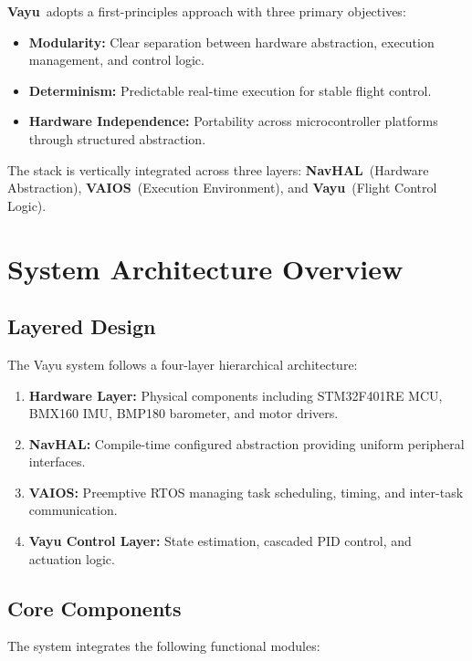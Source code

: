\documentclass[11pt]{article}
\newcommand{\vayuname}{\textbf{Vayu}}
\newcommand{\navhal}{\textbf{NavHAL}}
\newcommand{\vaios}{\textbf{VAIOS}}
\begin{document}
\vayuname~adopts a first-principles approach with three primary objectives:
\begin{itemize}[leftmargin=*]
    \item \textbf{Modularity:} Clear separation between hardware abstraction, execution management, and control logic.
    \item \textbf{Determinism:} Predictable real-time execution for stable flight control.
    \item \textbf{Hardware Independence:} Portability across microcontroller platforms through structured abstraction.
\end{itemize}

The stack is vertically integrated across three layers: \navhal~(Hardware Abstraction), \vaios~(Execution Environment), and \vayuname~(Flight Control Logic).

\section{System Architecture Overview}

\subsection{Layered Design}

The Vayu system follows a four-layer hierarchical architecture:

\begin{enumerate}[leftmargin=*]
    \item \textbf{Hardware Layer:} Physical components including STM32F401RE MCU, BMX160 IMU, BMP180 barometer, and motor drivers.
    \item \textbf{NavHAL:} Compile-time configured abstraction providing uniform peripheral interfaces.
    \item \textbf{VAIOS:} Preemptive RTOS managing task scheduling, timing, and inter-task communication.
    \item \textbf{Vayu Control Layer:} State estimation, cascaded PID control, and actuation logic.
\end{enumerate}

\subsection{Core Components}

The system integrates the following functional modules:
\end{document}
